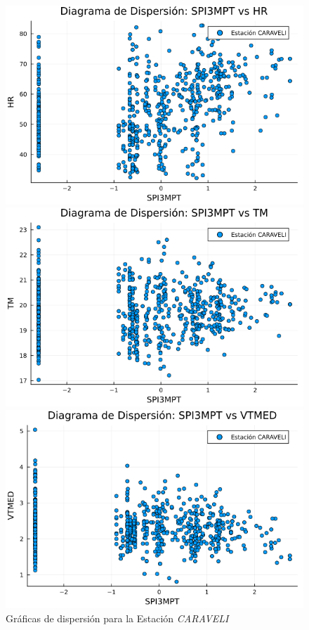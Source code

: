 \begin{figure}[htbp]
\centering
\caption{Gráficas de dispersión para la Estación \textit{CARAVELI}}
\begin{minipage}{0.32\textwidth}
    \centering
    \includegraphics[width=\linewidth]{Capitulos/Scaterplot/CARAVELI_SPI3MPT_vs_HR.png}
\end{minipage}\hfill
\begin{minipage}{0.32\textwidth}
    \centering
    \includegraphics[width=\linewidth]{Capitulos/Scaterplot/CARAVELI_SPI3MPT_vs_TM.png}
\end{minipage}\hfill
\begin{minipage}{0.32\textwidth}
    \centering
    \includegraphics[width=\linewidth]{Capitulos/Scaterplot/CARAVELI_SPI3MPT_vs_VTMED.png}

\end{minipage}
\end{figure}
